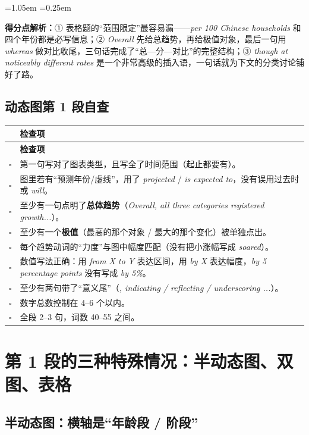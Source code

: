 \documentclass[11pt,a4paper]{ctexart}
\newcommand{\en}[1]{\textit{#1}}
\newenvironment{note}{%
  \par\addvspace{5pt}%
  \begin{list}{}{\leftmargin=1.05em \rightmargin=0.25em \listparindent=0pt
    \itemindent=0pt \topsep=0pt \parsep=2pt \itemsep=2pt \partopsep=0pt}%
  \item\relax\small\color{ink}%
}{%
  \end{list}\addvspace{5pt}%
}
\newcommand{\cb}{$\square$}
\begin{document}
\begin{note}
\textbf{得分点解析：}① 表格题的“范围限定”最容易漏——\en{per 100 Chinese households} 和四个年份都是必写信息；② \en{Overall} 先给总趋势，再给极值对象，最后一句用 \en{whereas} 做对比收尾，三句话完成了“总—分—对比”的完整结构；③ \en{though at noticeably different rates} 是一个非常高级的插入语，一句话就为下文的分类讨论铺好了路。
\end{note}

\subsection{动态图第 1 段自查}

\begin{longtable}{C{0.8cm} L{13.6cm}}
\toprule
& \textbf{检查项}\\
\midrule
\endfirsthead
\toprule
& \textbf{检查项}\\
\midrule
\endhead
\cb & 第一句写对了图表类型，且写全了时间范围（起止都要有）。\\
\cb & 图里若有“预测年份/虚线”，用了 \en{projected} / \en{is expected to}，没有误用过去时或 \en{will}。\\
\cb & 至少有一句点明了\textbf{总体趋势}（\en{Overall, all three categories registered growth...}）。\\
\cb & 至少有一个\textbf{极值}（最高的那个对象 / 最大的那个变化）被单独点出。\\
\cb & 每个趋势动词的“力度”与图中幅度匹配（没有把小涨幅写成 \en{soared}）。\\
\cb & 数值写法正确：用 \en{from X to Y} 表达区间，用 \en{by X} 表达幅度，\en{by 5 percentage points} 没有写成 \en{by 5\%}。\\
\cb & 至少有两句带了“意义尾”（\en{, indicating / reflecting / underscoring ...}）。\\
\cb & 数字总数控制在 4--6 个以内。\\
\cb & 全段 2--3 句，词数 40--55 之间。\\
\bottomrule
\end{longtable}

\clearpage

\section{第 1 段的三种特殊情况：半动态图、双图、表格}

\subsection{半动态图：横轴是“年龄段 / 阶段”}
\end{document}
